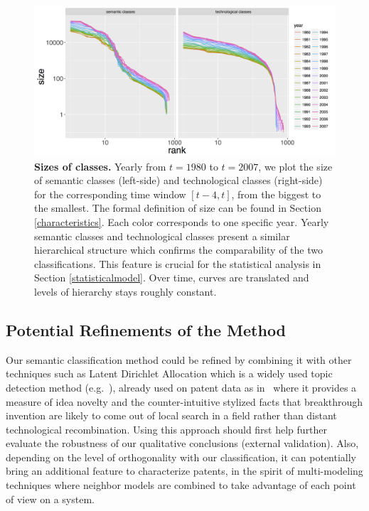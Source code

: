 \documentclass[12pt,twoside,a4paper]{article}
\begin{document}
\begin{figure}
\centering
\hspace*{-2.5cm}
\includegraphics[width=1.2\textwidth]{all_raw_counts.png}
\caption{\textbf{Sizes of classes.} Yearly from $t = 1980$ to $t =2007$, we plot the size of semantic classes (left-side) and technological classes (right-side) for the corresponding time window $[t-4, t]$, 
from the biggest to the smallest. The formal definition of size can be found in Section \ref{characteristics}. Each color corresponds to one specific year. Yearly semantic classes and technological classes present a similar hierarchical structure which confirms the comparability of the two classifications. This feature is crucial for the statistical analysis in Section \ref{statisticalmodel}. Over time, curves are translated and levels of hierarchy stays roughly constant.}
\label{fig:class-sizes}
\end{figure}



\subsection{Potential Refinements of the Method}

Our semantic classification method could be refined by combining it with other techniques such as Latent Dirichlet Allocation which is a widely used topic detection method (e.g.~\cite{blei2003latent}), already used on patent data as in~\cite{kaplan2015double} where it provides a measure of idea novelty and the counter-intuitive stylized facts that breakthrough invention are likely to come out of local search in a field rather than distant technological recombination. Using this approach should first help further evaluate the robustness of our qualitative conclusions (external validation). Also, depending on the level of orthogonality with our classification, it can potentially bring an additional feature to characterize patents, in the spirit of multi-modeling techniques where neighbor models are combined to take advantage of each point of view on a system.
\end{document}
